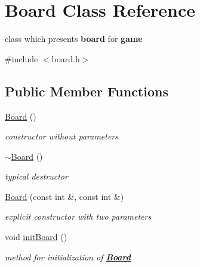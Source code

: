 \hypertarget{class_board}{}\section{Board Class Reference}
\label{class_board}


class which presents {\bfseries{board}} for {\bfseries{game}}  




{\ttfamily \#include $<$board.\+h$>$}

\subsection*{Public Member Functions}
\begin{DoxyCompactItemize}
\item 
\mbox{\label{class_board_a9ee491d4fea680cf69b033374a9fdfcb}} 
\mbox{\hyperlink{class_board_a9ee491d4fea680cf69b033374a9fdfcb}{Board}} ()
\begin{DoxyCompactList}\small\item\em {\itshape constructor} without parameters \end{DoxyCompactList}\item 
\mbox{\label{class_board_af73f45730119a1fd8f6670f53f959e68}} 
\mbox{\hyperlink{class_board_af73f45730119a1fd8f6670f53f959e68}{$\sim$\+Board}} ()
\begin{DoxyCompactList}\small\item\em typical {\itshape destructor} \end{DoxyCompactList}\item 
\mbox{\label{class_board_a6020b414abf52845908b6161bea1155d}} 
\mbox{\hyperlink{class_board_a6020b414abf52845908b6161bea1155d}{Board}} (const int \&, const int \&)
\begin{DoxyCompactList}\small\item\em explicit {\itshape constructor} with two parameters \end{DoxyCompactList}\item 
\mbox{\label{class_board_a67cf113c045c8aec1565f48eef8e5770}} 
void \mbox{\hyperlink{class_board_a67cf113c045c8aec1565f48eef8e5770}{init\+Board}} ()
\begin{DoxyCompactList}\small\item\em {\itshape method} for initialization of {\bfseries{\mbox{\hyperlink{class_board}{Board}}}} \end{DoxyCompactList}\item 

\end{DoxyCompactItemize}
